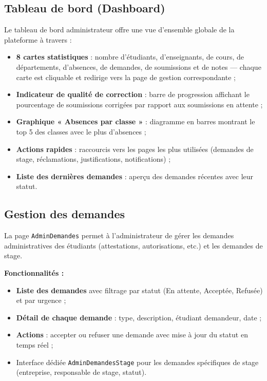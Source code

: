 \subsection{Tableau de bord (Dashboard)}

Le tableau de bord administrateur offre une vue d'ensemble globale de la plateforme à travers :

\begin{itemize}[noitemsep]
    \item \textbf{8 cartes statistiques} : nombre d'étudiants, d'enseignants, de cours, de départements, d'absences, de demandes, de soumissions et de notes — chaque carte est cliquable et redirige vers la page de gestion correspondante ;
    \item \textbf{Indicateur de qualité de correction} : barre de progression affichant le pourcentage de soumissions corrigées par rapport aux soumissions en attente ;
    \item \textbf{Graphique « Absences par classe »} : diagramme en barres montrant le top 5 des classes avec le plus d'absences ;
    \item \textbf{Actions rapides} : raccourcis vers les pages les plus utilisées (demandes de stage, réclamations, justifications, notifications) ;
    \item \textbf{Liste des dernières demandes} : aperçu des demandes récentes avec leur statut.
\end{itemize}


\subsection{Gestion des demandes}

La page \texttt{AdminDemandes} permet à l'administrateur de gérer les demandes administratives des étudiants (attestations, autorisations, etc.) et les demandes de stage.

\vspace{0.3cm}

\textbf{Fonctionnalités :}
\begin{itemize}[noitemsep]
    \item \textbf{Liste des demandes} avec filtrage par statut (En attente, Acceptée, Refusée) et par urgence ;
    \item \textbf{Détail de chaque demande} : type, description, étudiant demandeur, date ;
    \item \textbf{Actions} : accepter ou refuser une demande avec mise à jour du statut en temps réel ;
    \item Interface dédiée \texttt{AdminDemandesStage} pour les demandes spécifiques de stage (entreprise, responsable de stage, statut).
\end{itemize}


